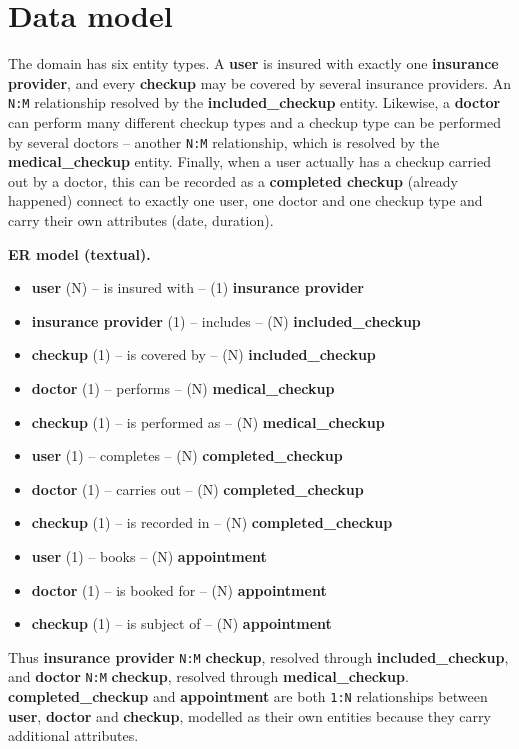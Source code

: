 \documentclass[11pt,a4paper]{article}
\begin{document}
\section{Data model}

The domain has six entity types. A \textbf{user} is insured with exactly one
\textbf{insurance provider}, and every \textbf{checkup} may be covered by
several insurance providers. An \texttt{N:M} relationship
resolved by the \textbf{included\_checkup} entity. Likewise, a \textbf{doctor} can perform many
different checkup types and a checkup type can be performed by several
doctors -- another \texttt{N:M} relationship, which is resolved by the
\textbf{medical\_checkup} entity. Finally, when a user actually has a checkup
carried out by a doctor, this can be recorded as a \textbf{completed
checkup} (already happened) connect to exactly one user, one doctor and one checkup type and
carry their own attributes (date, duration).

\begin{beispielbox}
\textbf{ER model (textual).}
\begin{itemize}[leftmargin=1.4em, topsep=2pt]
  \item \textbf{user} (N) \;--\; is insured with \;--\; (1) \textbf{insurance provider}
  \item \textbf{insurance provider} (1) \;--\; includes \;--\; (N) \textbf{included\_checkup}
  \item \textbf{checkup} (1) \;--\; is covered by \;--\; (N) \textbf{included\_checkup}
  \item \textbf{doctor} (1) \;--\; performs \;--\; (N) \textbf{medical\_checkup}
  \item \textbf{checkup} (1) \;--\; is performed as \;--\; (N) \textbf{medical\_checkup}
  \item \textbf{user} (1) \;--\; completes \;--\; (N) \textbf{completed\_checkup}
  \item \textbf{doctor} (1) \;--\; carries out \;--\; (N) \textbf{completed\_checkup}
  \item \textbf{checkup} (1) \;--\; is recorded in \;--\; (N) \textbf{completed\_checkup}
  \item \textbf{user} (1) \;--\; books \;--\; (N) \textbf{appointment}
  \item \textbf{doctor} (1) \;--\; is booked for \;--\; (N) \textbf{appointment}
  \item \textbf{checkup} (1) \;--\; is subject of \;--\; (N) \textbf{appointment}
\end{itemize}
Thus \textbf{insurance provider} \texttt{N:M} \textbf{checkup}, resolved
through \textbf{included\_checkup}, and \textbf{doctor} \texttt{N:M}
\textbf{checkup}, resolved through \textbf{medical\_checkup}.
\textbf{completed\_checkup} and \textbf{appointment} are both \texttt{1:N}
relationships between \textbf{user}, \textbf{doctor} and \textbf{checkup},
modelled as their own entities because they carry additional attributes.
\end{beispielbox}
\end{document}
